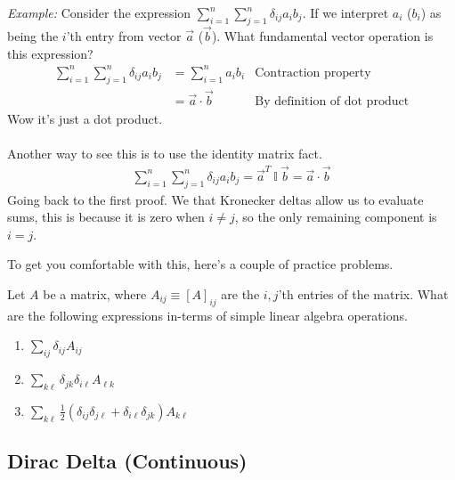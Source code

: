 \documentclass[12pt,fleqn]{article}
\numberwithin{equation}{section} %
\newcounter{problem}
\begin{document}
\begin{sidework}
	\emph{Example:} Consider the expression $\sum_{i=1}^n \sum_{j=1}^n \delta_{ij} a_i b_j$. If we interpret $a_i$ ($b_i$) as being the $i$'th entry from vector $\vec a$ ($\vec b$). What fundamental vector operation is this expression?
\begin{align}
	\sum_{i=1}^n \sum_{j=1}^n \delta_{ij} a_i b_j & = \sum_{i=1}^n a_i b_i & \text{Contraction property} \\
	& = \vec a \cdot \vec b & \text{By definition of dot product}
\end{align}
Wow it's just a dot product. \\
\\
Another way to see this is to use the identity matrix fact.
\begin{align}
	\sum_{i=1}^n \sum_{j=1}^n \delta_{ij} a_i b_j = \vec a^T ~\mathbb I ~\vec b = \vec a \cdot \vec b
\end{align}
Going back to the first proof. We that Kronecker deltas allow us to evaluate sums, this is because it is zero when $i \neq j$, so the only remaining component is $i= j$.
\end{sidework}
To get you comfortable with this, here's a couple of practice problems.
\begin{problem}
	Let $A$ be a matrix, where $A_{ij} \equiv [A]_{ij}$ are the $i,j$'th entries of the matrix. What are the following expressions in-terms of simple linear algebra operations.
	\begin{enumerate}
		\item $\sum_{ij} \delta_{ij} A_{ij}$ 
		\item $\sum_{k\ell} \delta_{jk} \delta_{i \ell} A_{\ell k}$
		\item $\sum_{k\ell} \frac{1}{2} (\delta_{ij} \delta_{j\ell} + \delta_{i \ell} \delta_{jk}) A_{k\ell} $
	\end{enumerate}
\end{problem}


\subsection{Dirac Delta (Continuous)}
\end{document}
